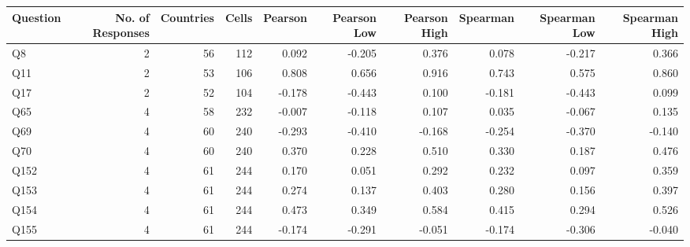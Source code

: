 
\begin{table}[!ht]
\centering
\renewcommand{\arraystretch}{1.15}
\begin{adjustbox}{width=\textwidth}
\Large
\begin{tabular}{lrrrrrrrrr}
\toprule
Question & No. of Responses & Countries & Cells & Pearson & Pearson Low & Pearson High & Spearman & Spearman Low & Spearman High \\
\midrule
Q8 & 2 & 56 & 112 & 0.092 & -0.205 & 0.376 & 0.078 & -0.217 & 0.366 \\
Q11 & 2 & 53 & 106 & 0.808 & 0.656 & 0.916 & 0.743 & 0.575 & 0.860 \\
Q17 & 2 & 52 & 104 & -0.178 & -0.443 & 0.100 & -0.181 & -0.443 & 0.099 \\
Q65 & 4 & 58 & 232 & -0.007 & -0.118 & 0.107 & 0.035 & -0.067 & 0.135 \\
Q69 & 4 & 60 & 240 & -0.293 & -0.410 & -0.168 & -0.254 & -0.370 & -0.140 \\
Q70 & 4 & 60 & 240 & 0.370 & 0.228 & 0.510 & 0.330 & 0.187 & 0.476 \\
Q152 & 4 & 61 & 244 & 0.170 & 0.051 & 0.292 & 0.232 & 0.097 & 0.359 \\
Q153 & 4 & 61 & 244 & 0.274 & 0.137 & 0.403 & 0.280 & 0.156 & 0.397 \\
Q154 & 4 & 61 & 244 & 0.473 & 0.349 & 0.584 & 0.415 & 0.294 & 0.526 \\
Q155 & 4 & 61 & 244 & -0.174 & -0.291 & -0.051 & -0.174 & -0.306 & -0.040 \\
\bottomrule
\end{tabular}

\end{adjustbox}
\end{table}
